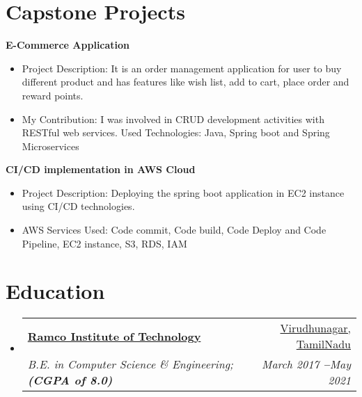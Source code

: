 \documentclass[letterpaper,10pt]{article}
\makeatletter
\newcommand{\resumeItem}[1]{
  \item\small{
    {#1 \vspace{-3pt}}
  }
}
\newcommand{\resumeEducationHeading}[4]{
  \vspace{-3pt}\item
    \begin{tabular*}{0.97\textwidth}[t]{l@{\extracolsep{\fill}}r}
      \textbf{#1} & #2 \\
      \textit{\small#3} & \textit{\small #4} \\
    \end{tabular*}\vspace{-15pt}
}
\newcommand{\resumeSubHeadingListStart}{\begin{itemize}[leftmargin=0.15in, label={}]}
\newcommand{\resumeSubHeadingListEnd}{\end{itemize}}
\newcommand{\resumeItemListStart}{\begin{itemize}}
\newcommand{\resumeItemListEnd}{\end{itemize}\vspace{-5pt}}
\makeatother
\begin{document}
 \section{Capstone Projects}
 \vspace{6pt}
 \resumeSubHeadingListStart
 \small{\item{
\textbf{ E-Commerce Application}
 \resumeItemListStart
	            \resumeItem{Project Description: It is an order management application for user to buy different product and has features like wish list, add to cart, place order and reward points.}
       		 \resumeItem{My Contribution: I was involved in CRUD development activities with RESTful web services. Used Technologies: Java, Spring boot and Spring Microservices}
        \resumeItemListEnd

\textbf{CI/CD implementation in AWS Cloud}

 \resumeItemListStart
	            \resumeItem{Project Description: Deploying the spring boot application in EC2 instance using CI/CD technologies.}
		 \resumeItem{AWS Services Used: Code commit, Code build, Code Deploy and Code Pipeline, EC2 instance, S3, RDS, IAM}
        \resumeItemListEnd

       
 }}
\resumeSubHeadingListEnd


\section{Education}
\vspace{6pt}
  \resumeSubHeadingListStart
    \resumeEducationHeading
{\textbf{\href{https://www.ritrjpm.ac.in/}{Ramco Institute of Technology}}} %
      {{\href{https://maps.app.goo.gl/hTBB5A97REHcSghFA}{Virudhunagar, TamilNadu}}}
      {B.E. in Computer Science \& Engineering;   \textbf{(CGPA of 8.0)}}{March 2017 \textbf{--}May 2021}
      {\textbf{}}{ \textbf{}}
  \resumeSubHeadingListEnd
\end{document}
